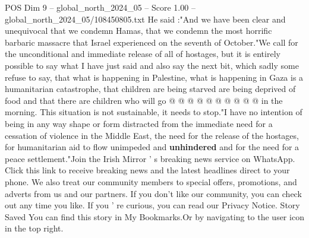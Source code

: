 \begin{textsample}{POS Dim 9 – global\_north\_2024\_05 – Score 1.00 – global\_north\_2024\_05/108450805.txt}
He said :"And we have been clear and unequivocal that we condemn Hamas, that we condemn the most horrific barbaric massacre that Israel experienced on the seventh of October."We call for the unconditional and immediate release of all of hostages, but it is entirely possible to say what I have just said and also say the next bit, which sadly some refuse to say, that what is happening in Palestine, what is happening in Gaza is a humanitarian catastrophe, that children are being starved are being deprived of food and that there are children who will go @ @ @ @ @ @ @ @ @ @ in the morning.
This situation is not sustainable, it needs to stop."I have no intention of being in any way shape or form distracted from the immediate need for a cessation of violence in the Middle East, the need for the release of the hostages, for humanitarian aid to flow unimpeded and \textbf{unhindered} and for the need for a peace settlement."Join the Irish Mirror ' s breaking news service on WhatsApp.
Click this link to receive breaking news and the latest headlines direct to your phone.
We also treat our community members to special offers, promotions, and adverts from us and our partners.
If you don't like our community, you can check out any time you like.
If you ' re curious, you can read our Privacy Notice.
Story Saved You can find this story in My Bookmarks.Or by navigating to the user icon in the top right.

\end{textsample}
